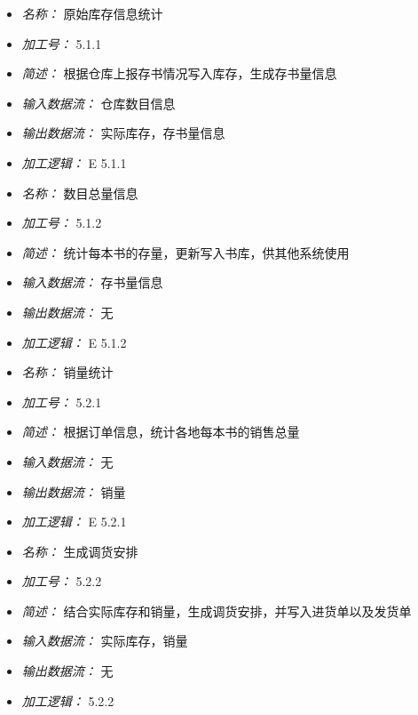 \begin{itemize}
\item \textit{名称： } 原始库存信息统计
\item \textit{加工号： }5.1.1
\item \textit{简述： } 根据仓库上报存书情况写入库存，生成存书量信息 
\item \textit{输入数据流： } 仓库数目信息
\item \textit{输出数据流： } 实际库存，存书量信息
\item \textit{加工逻辑： } E 5.1.1

\end{itemize}


\vspace{-1mm}


\begin{itemize}
\item \textit{名称： } 数目总量信息
\item \textit{加工号： }5.1.2
\item \textit{简述： } 统计每本书的存量，更新写入书库，供其他系统使用 
\item \textit{输入数据流： } 存书量信息
\item \textit{输出数据流： } 无
\item \textit{加工逻辑： } E 5.1.2

\end{itemize}


\vspace{-1mm}


\begin{itemize}
\item \textit{名称： }销量统计
\item \textit{加工号： }5.2.1
\item \textit{简述： } 根据订单信息，统计各地每本书的销售总量 
\item \textit{输入数据流： } 无
\item \textit{输出数据流： } 销量
\item \textit{加工逻辑： } E 5.2.1

\end{itemize}


\vspace{-1mm}


\begin{itemize}
\item \textit{名称： }生成调货安排
\item \textit{加工号： }5.2.2
\item \textit{简述： } 结合实际库存和销量，生成调货安排，并写入进货单以及发货单 
\item \textit{输入数据流： } 实际库存，销量
\item \textit{输出数据流： } 无
\item \textit{加工逻辑： } 5.2.2

\end{itemize}


